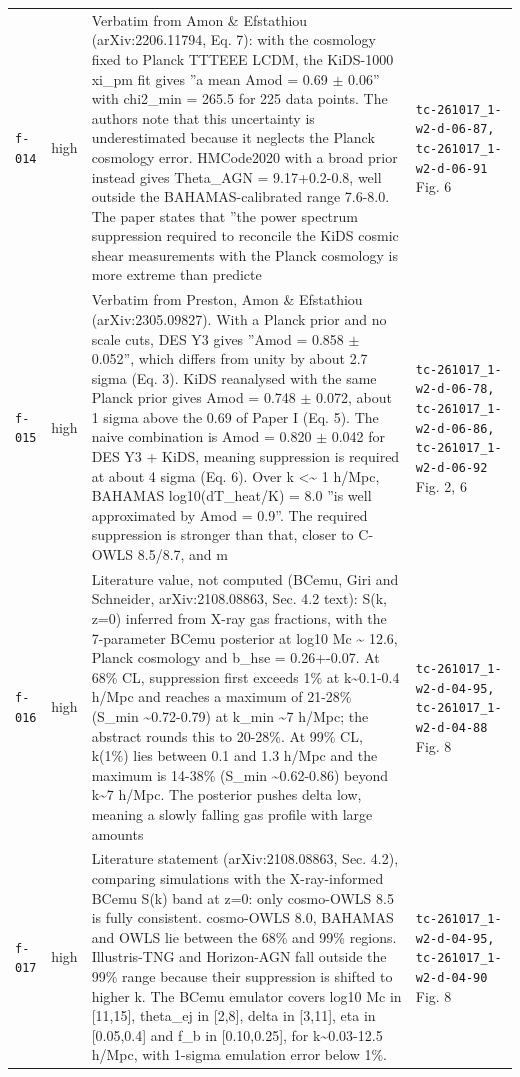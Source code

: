 \documentclass[11pt,a4paper]{article}
\begin{document}
\begin{longtable}{@{}p{}p{}p{}p{}@{}}
\texttt{f-014} & high & Verbatim from Amon \& Efstathiou (arXiv:2206.11794, Eq. 7): with the cosmology fixed to Planck TTTEEE LCDM, the KiDS-1000 xi\_pm fit gives ''a mean Amod = 0.69 $\pm$ 0.06'' with chi2\_min = 265.5 for 225 data points. The authors note that this uncertainty is underestimated because it neglects the Planck cosmology error. HMCode2020 with a broad prior instead gives Theta\_AGN = 9.17+0.2-0.8, well outside the BAHAMAS-calibrated range 7.6-8.0. The paper states that ''the power spectrum suppression required to reconcile the KiDS cosmic shear measurements with the Planck cosmology is more extreme than predicte & \texttt{tc-261017\_\allowbreak{}1-w2-d-06-87,\allowbreak{} tc-261017\_\allowbreak{}1-w2-d-06-91} Fig. 6 \\
\texttt{f-015} & high & Verbatim from Preston, Amon \& Efstathiou (arXiv:2305.09827). With a Planck prior and no scale cuts, DES Y3 gives ''Amod = 0.858 $\pm$ 0.052'', which differs from unity by about 2.7 sigma (Eq. 3). KiDS reanalysed with the same Planck prior gives Amod = 0.748 $\pm$ 0.072, about 1 sigma above the 0.69 of Paper I (Eq. 5). The naive combination is Amod = 0.820 $\pm$ 0.042 for DES Y3 + KiDS, meaning suppression is required at about 4 sigma (Eq. 6). Over k \textless{}\textasciitilde{} 1 h/Mpc, BAHAMAS log10(dT\_heat/K) = 8.0 ''is well approximated by Amod = 0.9''. The required suppression is stronger than that, closer to C-OWLS 8.5/8.7, and m & \texttt{tc-261017\_\allowbreak{}1-w2-d-06-78,\allowbreak{} tc-261017\_\allowbreak{}1-w2-d-06-86,\allowbreak{} tc-261017\_\allowbreak{}1-w2-d-06-92} Fig. 2, 6 \\
\texttt{f-016} & high & Literature value, not computed (BCemu, Giri and Schneider, arXiv:2108.08863, Sec. 4.2 text): S(k, z=0) inferred from X-ray gas fractions, with the 7-parameter BCemu posterior at log10 Mc \textasciitilde{} 12.6, Planck cosmology and b\_hse = 0.26+-0.07. At 68\% CL, suppression first exceeds 1\% at k\textasciitilde{}0.1-0.4 h/Mpc and reaches a maximum of 21-28\% (S\_min \textasciitilde{}0.72-0.79) at k\_min \textasciitilde{}7 h/Mpc; the abstract rounds this to 20-28\%. At 99\% CL, k(1\%) lies between 0.1 and 1.3 h/Mpc and the maximum is 14-38\% (S\_min \textasciitilde{}0.62-0.86) beyond k\textasciitilde{}7 h/Mpc. The posterior pushes delta low, meaning a slowly falling gas profile with large amounts  & \texttt{tc-261017\_\allowbreak{}1-w2-d-04-95,\allowbreak{} tc-261017\_\allowbreak{}1-w2-d-04-88} Fig. 8 \\
\texttt{f-017} & high & Literature statement (arXiv:2108.08863, Sec. 4.2), comparing simulations with the X-ray-informed BCemu S(k) band at z=0: only cosmo-OWLS 8.5 is fully consistent. cosmo-OWLS 8.0, BAHAMAS and OWLS lie between the 68\% and 99\% regions. Illustris-TNG and Horizon-AGN fall outside the 99\% range because their suppression is shifted to higher k. The BCemu emulator covers log10 Mc in [11,15], theta\_ej in [2,8], delta in [3,11], eta in [0.05,0.4] and f\_b in [0.10,0.25], for k\textasciitilde{}0.03-12.5 h/Mpc, with 1-sigma emulation error below 1\%. & \texttt{tc-261017\_\allowbreak{}1-w2-d-04-95,\allowbreak{} tc-261017\_\allowbreak{}1-w2-d-04-90} Fig. 8 \\

\end{longtable}
\end{document}
